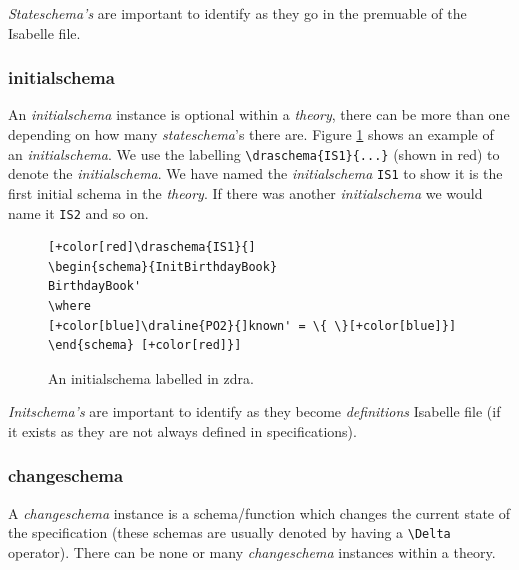 \emph{Stateschema's} are important to identify as they go in the premuable of the
Isabelle file.

\subsubsection{initialschema}

An \emph{initialschema} instance is optional within a \emph{theory}, there can
be more than one depending on how many \emph{stateschema}'s there are. Figure
\ref{fig:exampleofis} shows an example of an \emph{initialschema}. We use the
labelling \verb|\draschema{IS1}{...}| (shown in red) to denote the
\emph{initialschema}. We have named the \emph{initialschema} \verb|IS1| to show
it is the first initial schema in the \emph{theory}. If there was another
\emph{initialschema} we would name it \verb|IS2| and so on.

\begin{figure}[H]
\centering
\begin{footnotesize}
\begin{BVerbatim}[commandchars=+\[\]]
[+color[red]\draschema{IS1}{]
\begin{schema}{InitBirthdayBook} 
BirthdayBook' 
\where 
[+color[blue]\draline{PO2}{]known' = \{ \}[+color[blue]}]
\end{schema} [+color[red]}]
\end{BVerbatim}
\caption{\label{fig:exampleofis} An initialschema labelled in \gls{zdra}.}
\end{footnotesize}
\end{figure}

\emph{Initschema's} are important to identify as they become \emph{definitions}
Isabelle file (if it exists as they are not always defined in specifications).

\subsubsection{changeschema}

A \emph{changeschema} instance is a schema/function which changes the current
state of the specification (these schemas are usually denoted by having a
\verb|\Delta| operator). There can be none or many \emph{changeschema} instances
within a theory.

